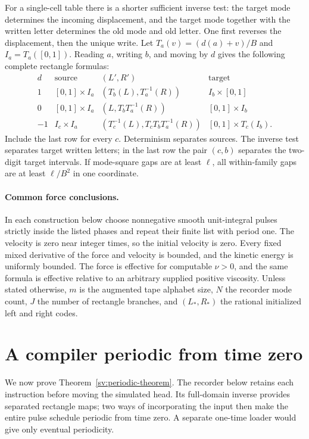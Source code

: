 For a single-cell table there is a shorter sufficient inverse test: the
target mode determines the incoming displacement, and the target mode
together with the written letter determines the old mode and old letter.
One first reverses the displacement, then the unique write.  Let
$T_a(v)=(d(a)+v)/B$ and $I_a=T_a([0,1])$.  Reading $a$, writing $b$,
and moving by $d$ gives the following complete rectangle formulas:
\begin{equation}\label{sv:single-cell-maps}
\begin{array}{c|c|c|c}
d&\text{source}&(L',R')&\text{target}\\\hline
1 &[0,1]\times I_a &(T_b(L),T_a^{-1}(R))&I_b\times[0,1]\\
0 &[0,1]\times I_a &(L,T_bT_a^{-1}(R))&[0,1]\times I_b\\
-1&I_c\times I_a &(T_c^{-1}(L),T_cT_bT_a^{-1}(R))
 &[0,1]\times T_c(I_b).
\end{array}
\end{equation}
Include the last row for every $c$.  Determinism separates sources.
The inverse test separates target written letters; in the last row the
pair $(c,b)$ separates the two-digit target intervals.  If mode-square
gaps are at least $\ell$, all within-family gaps are at least
$\ell/B^2$ in one coordinate.

\paragraph{Common force conclusions.}
In each construction below choose nonnegative smooth unit-integral
pulses strictly inside the listed phases and repeat their finite list
with period one.  The velocity is zero near integer times, so the
initial velocity is zero.  Every fixed mixed derivative of the force
and velocity is bounded, and the kinetic energy is uniformly bounded.
The force is effective for computable $\nu>0$, and the same formula is
effective relative to an arbitrary supplied positive viscosity.
Unless stated otherwise, $m$ is the augmented tape alphabet size,
$N$ the recorder mode count, $J$ the number of rectangle branches,
and $(L_*,R_*)$ the rational initialized left and right codes.

\section{A compiler periodic from time zero}
\label{sv:periodic-compiler}

We now prove Theorem~\ref{sv:periodic-theorem}. The recorder below retains
each instruction before moving the simulated head. Its full-domain inverse
provides separated rectangle maps; two ways of incorporating the input
then make the entire pulse schedule periodic from time zero. A separate
one-time loader would give only eventual periodicity.

